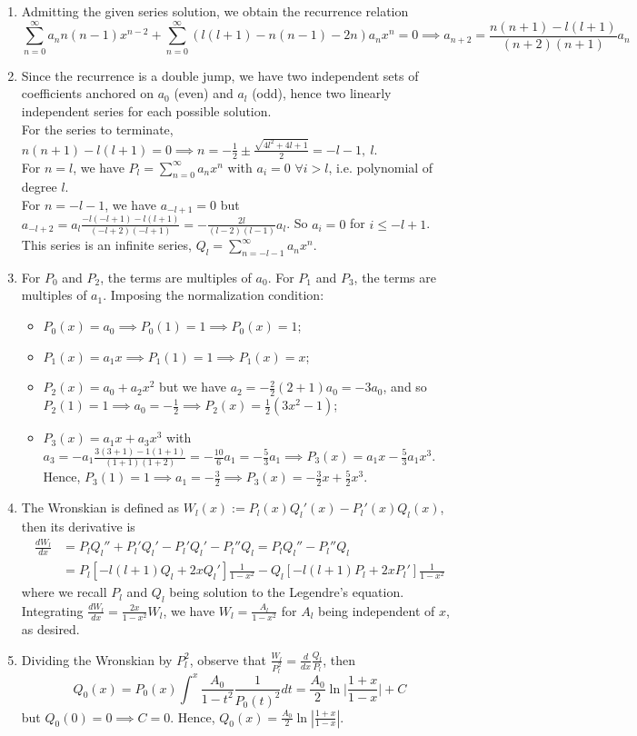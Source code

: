 \documentclass[a4paper]{article}
\begin{document}
\begin{ans}\leavevmode
\begin{enumerate}[label=(\alph*)]
\item Admitting the given series solution, we obtain the recurrence relation
$$\sum_{n=0}^\infty a_nn(n-1)x^{n-2}+\sum_{n=0}^\infty (l(l+1)-n(n-1)-2n)a_nx^n=0\implies a_{n+2}=\frac{n(n+1)-l(l+1)}{(n+2)(n+1)}a_n$$
\item Since the recurrence is a double jump, we have two independent sets of coefficients anchored on $a_0$ (even) and $a_l$ (odd), hence two linearly independent series for each possible solution.\\[5pt]
For the series to terminate, $n(n+1)-l(l+1)=0\implies n=-\frac{1}{2}\pm\frac{\sqrt{4l^2+4l+1}}{2}=-l-1,~l$.\\[5pt]
For $n=l$, we have $P_l=\sum_{n=0}^\infty a_nx^n$ with $a_i=0$ $\forall i>l$, i.e. polynomial of degree $l$.\\[5pt]
For $n=-l-1$, we have $a_{-l+1}=0$ but $a_{-l+2}=a_l\frac{-l(-l+1)-l(l+1)}{(-l+2)(-l+1)}=-\frac{2l}{(l-2)(l-1)}a_l$. So $a_i=0$ for $i\leq -l+1$. This series is an infinite series, $Q_l=\sum_{n=-l-1}^\infty a_nx^n$. 
\item For $P_0$ and $P_2$, the terms are multiples of $a_0$. For $P_1$ and $P_3$, the terms are multiples of $a_1$. Imposing the normalization condition:
\begin{itemize}
    \item $P_0(x)=a_0\implies P_0(1)=1\implies P_0(x)=1$;
    \item $P_1(x)=a_1x\implies P_1(1)=1\implies P_1(x)=x$;
    \item $P_2(x)=a_0+a_2x^2$ but we have $a_2=-\frac{2}{2}(2+1)a_0=-3a_0$, and so $P_2(1)=1\implies a_0=-\frac{1}{2}\implies P_2(x)=\frac{1}{2}(3x^2-1)$;
    \item  $P_3(x)=a_1x+a_3x^3$ with $a_3=-a_1\frac{3(3+1)-1(1+1)}{(1+1)(1+2)}=-\frac{10}{6}a_1=-\frac{5}{3}a_1\implies P_3(x)=a_1x-\frac{5}{3}a_1x^3$. Hence, $P_3(1)=1\implies a_1=-\frac{3}{2}\implies P_3(x)=-\frac{3}{2}x+\frac{5}{2}x^3$.
\end{itemize}
\item The Wronskian is defined as $W_l(x):=P_l(x)Q_l'(x)-P_l'(x)Q_l(x)$, then its derivative is
\begin{align}
\frac{dW_l}{dx}&=P_lQ_l''+P_l'Q_l'-P_l'Q_l'-P_l''Q_l=P_lQ_l''-P_l''Q_l\nonumber\\&=P_l[-l(l+1)Q_l+2xQ_l']\frac{1}{1-x^2}-Q_l[-l(l+1)P_l+2xP_l']\frac{1}{1-x^2}\nonumber
\end{align}
where we recall $P_l$ and $Q_l$ being solution to the Legendre's equation. Integrating $\frac{dW_l}{dx}=\frac{2x}{1-x^2}W_l$, we have $W_l=\frac{A_l}{1-x^2}$ for $A_l$ being independent of $x$, as desired.
\item Dividing the Wronskian by $P_l^2$, observe that $\frac{W_l}{P_l^2}=\frac{d}{dx}\frac{Q_l}{P_l}$, then 
$$Q_0(x)=P_0(x)\int^x\frac{A_0}{1-t^2}\frac{1}{P_0(t)^2}dt=\frac{A_0}{2}\ln\bigg|\frac{1+x}{1-x}\bigg|+C$$
but $Q_0(0)=0\implies C=0$. Hence, $Q_0(x)=\frac{A_0}{2}\ln|\frac{1+x}{1-x}|$.
\end{enumerate}
\end{ans}
\end{document}
